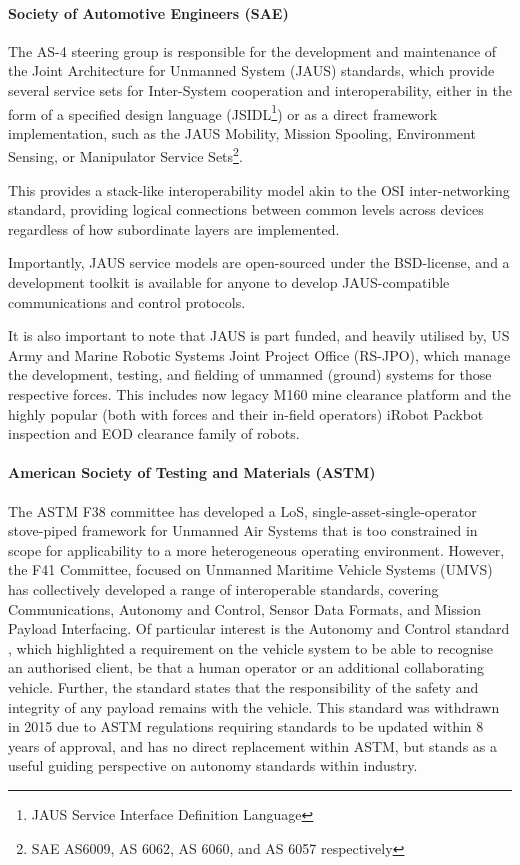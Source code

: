 \paragraph{Society of Automotive Engineers (SAE)}

The AS-4 steering group is responsible for the development and maintenance of the Joint Architecture for Unmanned System (JAUS) standards, which provide several service sets for Inter-System cooperation and interoperability, either in the form of a specified design language (JSIDL\footnote{JAUS Service Interface Definition Language}) or as a direct framework implementation, such as the JAUS Mobility, Mission Spooling, Environment Sensing, or Manipulator Service Sets\footnote{SAE AS6009, AS 6062, AS 6060, and AS 6057 respectively}.

This provides a stack-like interoperability model akin to the OSI inter-networking standard, providing logical connections between common levels across devices regardless of how subordinate layers are implemented.

Importantly, JAUS service models are open-sourced under the BSD-license, and a development toolkit is available for anyone to develop JAUS-compatible communications and control protocols\cite{JTS}. 

It is also important to note that JAUS is part funded, and heavily utilised by, US Army and Marine Robotic Systems Joint Project Office (RS-JPO), which manage the development, testing, and fielding of unmanned (ground) systems for those respective forces.
This includes now legacy M160 mine clearance platform and the highly popular (both with forces and their in-field operators) iRobot Packbot inspection and EOD clearance family of robots.


\paragraph{American Society of Testing and Materials (ASTM)}

The ASTM F38 committee has developed a LoS, single-asset-single-operator stove-piped framework for Unmanned Air Systems that is too constrained in scope for applicability to a more heterogeneous operating environment\cite{AmericanSocietyofTestingandMaterials2007}.
However, the F41 Committee, focused on Unmanned Maritime Vehicle Systems (UMVS) has collectively developed a range of interoperable standards, covering Communications, Autonomy and Control, Sensor Data Formats, and Mission Payload Interfacing.
Of particular interest is the Autonomy and Control standard \cite{AmericanSocietyofTestingandMaterials2006}, which highlighted a requirement on the vehicle system to be able to recognise an authorised client, be that a human operator or an additional collaborating vehicle.
Further, the standard states that the responsibility of the safety and integrity of any payload remains with the vehicle.
This standard was withdrawn in 2015 due to ASTM regulations requiring standards to be updated within 8 years of approval, and has no direct replacement within ASTM, but stands as a useful guiding perspective on autonomy standards within industry.

